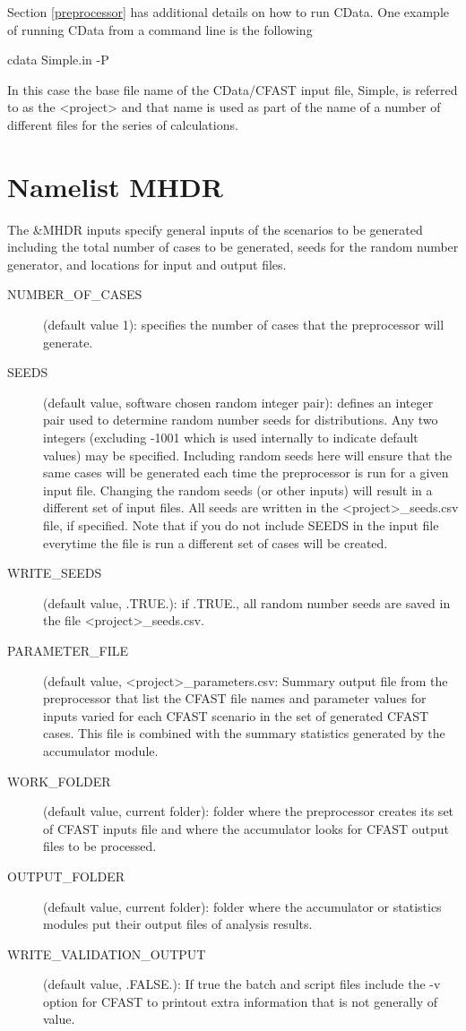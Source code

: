 \documentclass[12pt,twoside]{book}
\begin{document}
Section \ref{preprocessor} has additional details on how to run CData. One example of running CData from a command line is the following

\vspace{\baselineskip}
{\ct cdata Simple.in -P}
\vspace{\baselineskip}

In this case the base file name of the CData/CFAST input file, {\ct Simple}, is referred to as the {\ct <project>} and that name is used as part of the name of a number of different files for the series of calculations.

\section{Namelist MHDR}
\label{info:MHDR}

The {\ct \&MHDR} inputs specify general inputs of the scenarios to be generated including the total number of cases to be generated, seeds for the random number generator, and locations for input and output files.

\begin{description}
  \item[NUMBER\_OF\_CASES] (default value 1): specifies the number of cases that the preprocessor will generate.
  \item[SEEDS] (default value, software chosen random integer pair): defines an integer pair used to determine random number seeds for distributions. Any two integers (excluding -1001 which is used internally to indicate default values) may be specified. Including random seeds here will ensure that the same cases will be generated each time the preprocessor is run for a given input file. Changing the random seeds (or other inputs) will result in a different set of input files.  All seeds are written in the {\ct <project>\_seeds.csv} file, if specified. Note that if you do not include {\ct SEEDS} in the input file everytime the file is run a different set of cases will be created.
  \item[WRITE\_SEEDS] (default value, .TRUE.): if .TRUE., all random number seeds are saved in the file {\ct <project>\_seeds.csv}.
  \item[PARAMETER\_FILE] (default value, {\ct <project>\_parameters.csv}: Summary output file from the preprocessor that list the CFAST file names and parameter values for inputs varied for each CFAST scenario in the set of generated CFAST cases. This file is combined with the summary statistics generated by the accumulator module.
  \item[WORK\_FOLDER] (default value, current folder): folder where the preprocessor creates its set of CFAST inputs file and where the accumulator looks for CFAST output files to be processed.
  \item[OUTPUT\_FOLDER] (default value, current folder): folder where the accumulator or statistics modules put their output files of analysis results.
  \item[WRITE\_VALIDATION\_OUTPUT] (default value, .FALSE.): If true the batch and script files include the -v option for CFAST to printout extra information that is not generally of value. 
\end{description}
\end{document}
